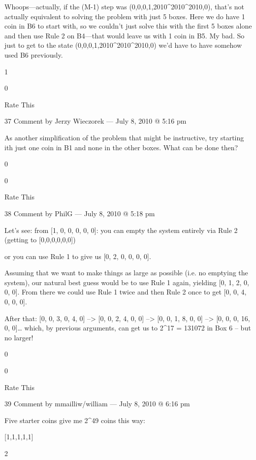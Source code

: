         Whoops—actually, if the (M-1) step was (0,0,0,1,2010^{2010^{2010}},0), that’s not actually equivalent to solving the problem with just 5 boxes. Here we do have 1 coin in B6 to start with, so we couldn’t just solve this with the first 5 boxes alone and then use Rule 2 on B4—that would leave us with 1 coin in B5. My bad. So just to get to the state (0,0,0,1,2010^{2010^{2010}},0) we’d have to have somehow used B6 previously.
         
        1
         
        0
         
        Rate This

        37 Comment by Jerzy Wieczorek — July 8, 2010 @ 5:16 pm

    As another simplification of the problem that might be
    instructive, try starting ith just one coin in B1 and none in the
    other boxes. What can be done then?
     
    0
     
    0
     
    Rate This

    38 Comment by PhilG — July 8, 2010 @ 5:18 pm

        Let’s see: from [1, 0, 0, 0, 0, 0]: you can empty the system entirely via Rule 2 (getting to [0,0,0,0,0,0])

        or you can use Rule 1 to give us
        [0, 2, 0, 0, 0, 0].

        Assuming that we want to make things as large as possible (i.e. no emptying the system), our natural best guess would be to use Rule 1 again, yielding
        [0, 1, 2, 0, 0, 0]. From there we could use Rule 1 twice and then Rule 2 once to get [0, 0, 4, 0, 0, 0].

        After that: [0, 0, 3, 0, 4, 0] –> [0, 0, 2, 4, 0, 0] –> [0, 0, 1, 8, 0, 0] –> [0, 0, 0, 16, 0, 0]… which, by previous arguments, can get us to 2^17 = 131072 in Box 6 – but no larger!
         
        0
         
        0
         
        Rate This

        39 Comment by mmailliw/william — July 8, 2010 @ 6:16 pm

    Five starter coins give me 2^{49} coins this way:

    [1,1,1,1,1] \to [0,1,5,0,3] \to [0,1,1,0,48] \to [0,0,48,0,0] \to [0,0,0,0,2^{49}]
     
    2
     
